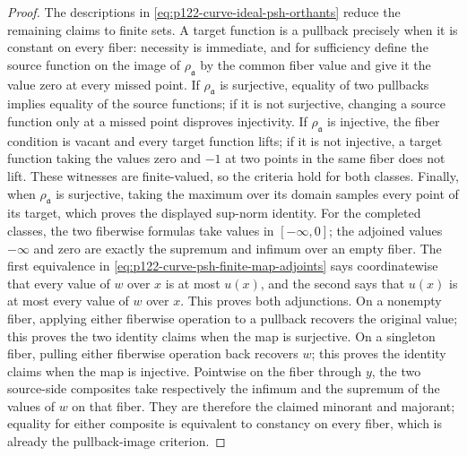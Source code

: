 \begin{proof}
The descriptions in \eqref{eq:p122-curve-ideal-psh-orthants} reduce the
remaining claims to finite sets.  A target function is a pullback precisely
when it is constant on every fiber: necessity is immediate, and for
sufficiency define the source function on the image of
\(\rho_{\mathfrak a}\) by the common fiber value and give it the value zero
at every missed point.  If \(\rho_{\mathfrak a}\) is surjective, equality of
two pullbacks implies equality of the source functions; if it is not
surjective, changing a source function only at a missed point disproves
injectivity.  If \(\rho_{\mathfrak a}\) is injective, the fiber condition is
vacant and every target function lifts; if it is not injective, a target
function taking the values zero and \(-1\) at two points in the same fiber
does not lift.  These witnesses are finite-valued, so the criteria hold for
both classes.  Finally, when \(\rho_{\mathfrak a}\) is surjective, taking
the maximum over its domain samples every point of its target, which proves
the displayed sup-norm identity.  For the completed classes, the two
fiberwise formulas take values in \([-\infty,0]\); the adjoined values
\(-\infty\) and zero are exactly the supremum and infimum over an empty
fiber.  The first equivalence in
\eqref{eq:p122-curve-psh-finite-map-adjoints} says coordinatewise that
every value of \(w\) over \(x\) is at most \(u(x)\), and the second says
that \(u(x)\) is at most every value of \(w\) over \(x\).  This proves both
adjunctions.  On a nonempty fiber, applying either fiberwise operation to a
pullback recovers the original value; this proves the two identity claims
when the map is surjective.  On a singleton fiber, pulling either fiberwise
operation back recovers \(w\); this proves the identity claims when the map
is injective.  Pointwise on the fiber through \(y\), the two source-side
composites take respectively the infimum and the supremum of the values of
\(w\) on that fiber.  They are therefore the claimed minorant and majorant;
equality for either composite is equivalent to constancy on every fiber,
which is already the pullback-image criterion.
\end{proof}

